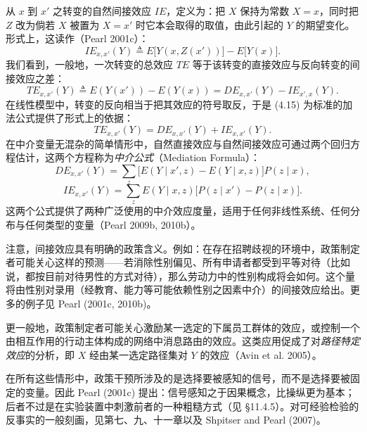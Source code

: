 从 $x$ 到 $x'$ 之转变的自然间接效应 $IE$，定义为：把 $X$ 保持为常数 $X=x$，同时把 $Z$ 改为倘若 $X$ 被置为 $X=x'$ 时它本会取得的取值，由此引起的 $Y$ 的期望变化。形式上，这读作（Pearl 2001c）：
\begin{equation}
IE_{x,x'}(Y)\triangleq E\big[Y(x,Z(x'))\big]-E\big[Y(x)\big]. \tag{4.14}
\end{equation}
我们看到，一般地，一次转变的总效应 $TE$ 等于该转变的直接效应与反向转变的间接效应之差：
\begin{equation}
TE_{x,x'}(Y)\triangleq E(Y(x'))-E(Y(x))=DE_{x,x'}(Y)-IE_{x',x}(Y). \tag{4.15}
\end{equation}
在线性模型中，转变的反向相当于把其效应的符号取反，于是 \textup{(4.15)} 为标准的加法公式提供了形式上的依据：
\begin{equation}
TE_{x,x'}(Y)=DE_{x,x'}(Y)+IE_{x,x'}(Y). \tag{4.16}
\end{equation}
在中介变量无混杂的简单情形中，自然直接效应与自然间接效应可通过两个回归方程估计，这两个方程称为\emph{中介公式}（Mediation Formula）：
\begin{equation}
DE_{x,x'}(Y)=\sum_z\big[E(Y\mid x',z)-E(Y\mid x,z)\big]P(z\mid x), \tag{4.17}
\end{equation}
\begin{equation}
IE_{x,x'}(Y)=\sum_z E(Y\mid x,z)\big[P(z\mid x')-P(z\mid x)\big]. \tag{4.18}
\end{equation}
这两个公式提供了两种广泛使用的中介效应度量，适用于任何非线性系统、任何分布与任何类型的变量（Pearl 2009b, 2010b）。

注意，间接效应具有明确的政策含义。例如：在存在招聘歧视的环境中，政策制定者可能关心这样的预测——若消除性别偏见、所有申请者都受到平等对待（比如说，都按目前对待男性的方式对待），那么劳动力中的性别构成将会如何。这个量将由性别对录用（经教育、能力等可能依赖性别之因素中介）的间接效应给出。更多的例子见 Pearl (2001c, 2010b)。

更一般地，政策制定者可能关心激励某一选定的下属员工群体的效应，或控制一个由相互作用的行动主体构成的网络中消息路由的效应。这类应用促成了对\emph{路径特定效应}的分析，即 $X$ 经由某一选定路径集对 $Y$ 的效应（Avin et al. 2005）。

在所有这些情形中，政策干预所涉及的是选择要被感知的信号，而不是选择要被固定的变量。因此 Pearl (2001c) 提出：信号感知之于因果概念，比操纵更为基本；后者不过是在实验装置中刺激前者的一种粗糙方式（见 \S 11.4.5）。对可经验检验的反事实的一般刻画，见第七、九、十一章以及 Shpitser and Pearl (2007)。
